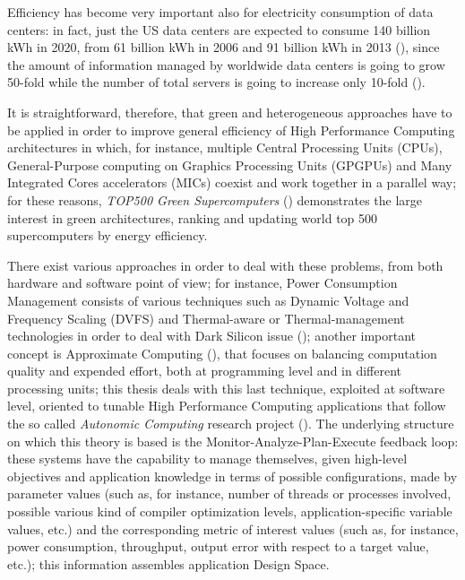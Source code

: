 Efficiency has become very important also for electricity consumption of data centers: in fact, just the US data centers are expected to consume 140 billion kWh in 2020, from 61 billion kWh in 2006 and 91 billion kWh in 2013 (\cite{site:NRDC2015}), since the amount of information managed by worldwide data centers is going to grow 50-fold while the number of total servers is going to increase only 10-fold (\cite{gantz2011extracting}).

It is straightforward, therefore, that green and heterogeneous approaches have to be applied in order to improve general efficiency of High Performance Computing architectures in which, for instance, multiple Central Processing Units (CPUs), General-Purpose computing on Graphics Processing Units (GPGPUs) and Many Integrated Cores accelerators (MICs) coexist and work together in a parallel way; for these reasons, \textit{TOP500 Green Supercomputers} (\cite{site:topGreen500}) demonstrates the large interest in green architectures, ranking and updating world top 500 supercomputers by energy efficiency.

There exist various approaches in order to deal with these problems, from both hardware and software point of view; for instance, Power Consumption Management consists of various techniques such as Dynamic Voltage and Frequency Scaling (DVFS) and Thermal-aware or Thermal-management technologies in order to deal with Dark Silicon issue (\cite{mittal2014power}); another important concept is Approximate Computing (\cite{mittal2016survey}), that focuses on balancing computation quality and expended effort, both at programming level and in different processing units; this thesis deals with this last technique, exploited at software level, oriented to tunable High Performance Computing applications that follow the so called \textit{Autonomic Computing} research project (\cite{kephart2003vision}). The underlying structure on which this theory is based is the Monitor-Analyze-Plan-Execute feedback loop: these systems have the capability to manage themselves, given high-level objectives and application knowledge in terms of possible configurations, made by parameter values (such as, for instance, number of threads or processes involved, possible various kind of compiler optimization levels, application-specific variable values, etc.) and the corresponding metric of interest values (such as, for instance, power consumption, throughput, output error with respect to a target value, etc.); this information assembles application Design Space.

